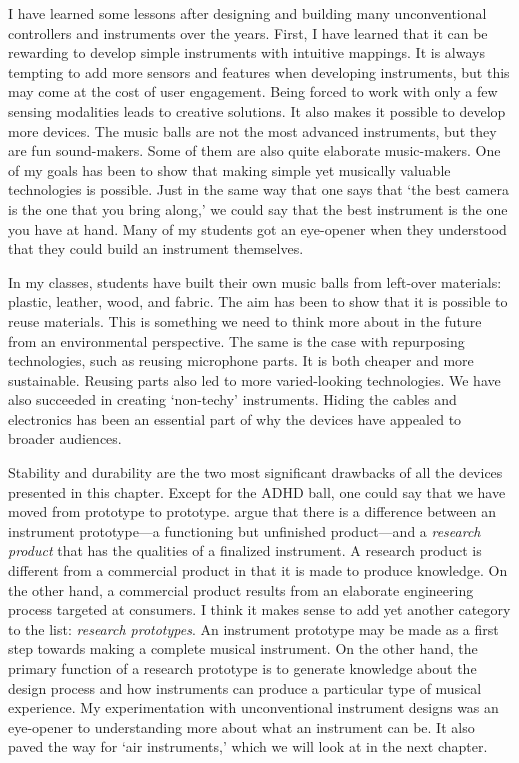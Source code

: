 I have learned some lessons after designing and building many unconventional controllers and instruments over the years. First, I have learned that it can be rewarding to develop simple instruments with intuitive mappings. It is always tempting to add more sensors and features when developing instruments, but this may come at the cost of user engagement. Being forced to work with only a few sensing modalities leads to creative solutions. It also makes it possible to develop more devices. The music balls are not the most advanced instruments, but they are fun sound-makers. Some of them are also quite elaborate music-makers. One of my goals has been to show that making simple yet musically valuable technologies is possible. Just in the same way that one says that `the best camera is the one that you bring along,' we could say that the best instrument is the one you have at hand. Many of my students got an eye-opener when they understood that they could build an instrument themselves.

In my classes, students have built their own music balls from left-over materials: plastic, leather, wood, and fabric. The aim has been to show that it is possible to reuse materials. This is something we need to think more about in the future from an environmental perspective. The same is the case with repurposing technologies, such as reusing microphone parts. It is both cheaper and more sustainable. Reusing parts also led to more varied-looking technologies. We have also succeeded in creating `non-techy' instruments. Hiding the cables and electronics has been an essential part of why the devices have appealed to broader audiences.

Stability and durability are the two most significant drawbacks of all the devices presented in this chapter. Except for the ADHD ball, one could say that we have moved from prototype to prototype. \citet{NIME20_86} argue that there is a difference between an instrument prototype---a functioning but unfinished product---and a \emph{research product} that has the qualities of a finalized instrument. A research product is different from a commercial product in that it is made to produce knowledge. On the other hand, a commercial product results from an elaborate engineering process targeted at consumers. I think it makes sense to add yet another category to the list: \emph{research prototypes}. An instrument prototype may be made as a first step towards making a complete musical instrument. On the other hand, the primary function of a research prototype is to generate knowledge about the design process and how instruments can produce a particular type of musical experience. My experimentation with unconventional instrument designs was an eye-opener to understanding more about what an instrument can be. It also paved the way for `air instruments,' which we will look at in the next chapter.
